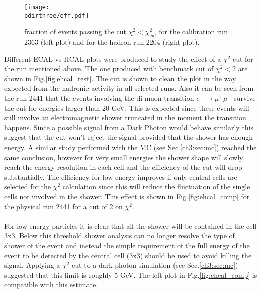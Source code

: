 \begin{figure}[h!]
  \begin{center}
    \texttt{[image: \\pdirthree/eff.pdf]}
  \end{center}
  \caption[fraction of events passing the $\chi^2$ cut]{fraction of events passing the cut $\chi^2 < \chi^2_{cut}$
    for the calibration run 2363 (left plot) and for the hadron run
    2204 (right plot).}
  \label{fig:eff}
\end{figure}

\clearpage

Different ECAL vs HCAL plots were produced to study the effect of a
$\chi^2$-cut for the run mentioned above. The one produced with
benchmark cut of $\chi^2 < 2$ are shown in
Fig.\ref{fig:ehcal_test}. The cut is shown to clean the plot in the
way expected from the hadronic activity in all selected runs. Also it
can be seen from the run 2441 that the events involving the di-muon
transition $e^- \to \mu^+\mu^-$ survive the cut for energies larger
than 20 GeV.  This is expected since these events will still involve
an electromagnetic shower truncated in the moment the transition
happens. Since a possible signal from a Dark Photon would behave
similarly this suggest that the cut won't reject the signal provided
that the shower has enough energy. A similar study performed with the
MC (see Sec.\ref{ch3:sec:mc}) reached the same conclusion, however for
very small energies the shower shape will slowly reach the energy
resolution in each cell and the efficiency of the cut will drop
substantially.  The efficiency for low energy improves if only central
cells are selected for the $\chi^2$ calculation since this will reduce
the fluctuation of the single cells not involved in the shower. This
effect is shown in Fig.\ref{fig:ehcal_comp} for the physical run 2441
for a cut of 2 on $\chi^2$.
\\
\\
For low energy particles it is clear that all the shower will be
contained in the cell 3x3. Below this threshold shower analysis can no
longer resolve the type of shower of the event and instead the simple
requirement of the full energy of the event to be detected by the
central cell (3x3) should be used to avoid killing the
signal. Applying a $\chi^2$-cut to a dark photon simulation (see
Sec.\ref{ch3:sec:mc}) suggested that this limit is roughly 5 GeV.  The
left plot in Fig.\ref{fig:ehcal_comp} is compatible with this
estimate.


